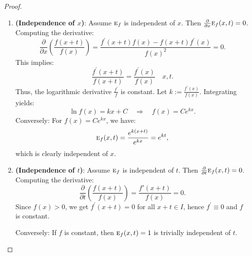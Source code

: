 \documentclass{amsart}
\theoremstyle{plain}
\numberwithin{equation}{section}
\newcommand{\eh}{\textsc{e}}
\begin{document}
\begin{proof}
\begin{enumerate}
    \item \textbf{(Independence of \( x \))}:
    Assume \( \eh_f \) is independent of \( x \). Then \( \frac{\partial}{\partial x} \eh_f(x,t) = 0 \). 
    Computing the derivative:
    \[
    \frac{\partial}{\partial x} \left( \frac{f(x+t)}{f(x)} \right) = \frac{f^\prime(x+t)f(x) - f(x+t)f^\prime(x)}{f(x)^2} = 0.
    \]
    This implies:
    \[
    \frac{f^\prime(x+t)}{f(x+t)} = \frac{f^\prime(x)}{f(x)} \quad  x, t.
    \]
    Thus, the logarithmic derivative \( \frac{f^\prime}{f} \) is constant. Let \( k := \frac{f^\prime(x)}{f(x)} \).
    Integrating yields:
    \[
    \ln f(x) = kx + C \quad \Rightarrow \quad f(x) = Ce^{kx}.
    \]
    Conversely: For \( f(x) = Ce^{kx} \), we have:
    \[
    \eh_f(x,t) = \frac{e^{k(x+t)}}{e^{kx}} = e^{kt},
    \]
    which is clearly independent of \( x \).

    \item \textbf{(Independence of \( t \))}:
    Assume \( \eh_f \) is independent of \( t \). Then \( \frac{\partial}{\partial t} \eh_f(x,t) = 0 \).
    Computing the derivative:
    \[
    \frac{\partial}{\partial t} \left( \frac{f(x+t)}{f(x)} \right) = \frac{f'(x+t)}{f(x)} = 0.
    \]
    Since \( f(x) > 0 \), we get \( f^\prime(x+t) = 0 \) for all \( x+t \in I \), hence \( f^\prime \equiv 0 \) and \( f \) is constant.
    
    Conversely: If \( f \) is constant, then \( \eh_f(x,t) = 1 \) is trivially independent of \( t \).
\end{enumerate}
\end{proof}

\end{document}
